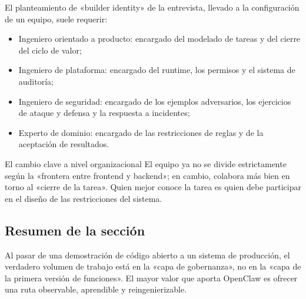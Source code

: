 El planteamiento de «builder identity» de la entrevista, llevado a la configuración de un equipo, suele requerir:
\begin{itemize}
    \item Ingeniero orientado a producto: encargado del modelado de tareas y del cierre del ciclo de valor;
    \item Ingeniero de plataforma: encargado del runtime, los permisos y el sistema de auditoría;
    \item Ingeniero de seguridad: encargado de los ejemplos adversarios, los ejercicios de ataque y defensa y la respuesta a incidentes;
    \item Experto de dominio: encargado de las restricciones de reglas y de la aceptación de resultados.
\end{itemize}

\begin{knowledgebox}{El cambio clave a nivel organizacional}
El equipo ya no se divide estrictamente según la «frontera entre frontend y backend»; en cambio, colabora más bien en torno al «cierre de la tarea». Quien mejor conoce la tarea es quien debe participar en el diseño de las restricciones del sistema.
\end{knowledgebox}

\subsection{Resumen de la sección}
Al pasar de una demostración de código abierto a un sistema de producción, el verdadero volumen de trabajo está en la «capa de gobernanza», no en la «capa de la primera versión de funciones». El mayor valor que aporta OpenClaw es ofrecer una ruta observable, aprendible y reingenierizable.

